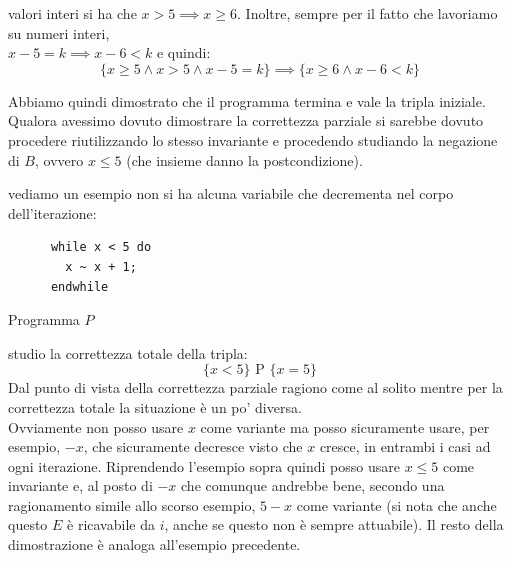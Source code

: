 \documentclass[a4paper,12pt, oneside]{book}
\begin{document}
\begin{esempio}
\begin{enumerate}
    valori interi si ha che $x>5\implies x\geq 6$. Inoltre, sempre per il fatto
    che lavoriamo su numeri interi, \\
    $x-5=k\implies x-6<k$ e quindi:
    \[\{x\geq 5\land x>5\land x-5=k\}\implies \{x\geq 6\land x-6 < k\}\]
  \end{enumerate}
  Abbiamo quindi dimostrato che il programma termina e vale la tripla
  iniziale.\\
  Qualora avessimo dovuto dimostrare la correttezza parziale si sarebbe dovuto
  procedere riutilizzando lo stesso invariante e procedendo studiando la
  negazione di $B$, ovvero $x\leq 5$ (che insieme danno la postcondizione).
\end{esempio}
\begin{esempio}
  vediamo un esempio non si ha alcuna variabile che decrementa nel corpo
  dell'iterazione:
  \begin{listing}[H]
    \begin{lstlisting}
      while x < 5 do
        x ~ x + 1;
      endwhile  
    \end{lstlisting}
    \caption{Programma $P$}
    \label{E:ti}
  \end{listing}
  studio la correttezza totale della tripla:
  \[\{x<5\}\mbox{ P }\{x=5\}\]
  Dal punto di vista della correttezza parziale ragiono come al solito mentre
  per la correttezza totale la situazione è un po' diversa.\\
  Ovviamente non posso usare $x$ come variante ma posso sicuramente usare, per
  esempio, $-x$, che sicuramente decresce visto che $x$ cresce, in entrambi i
  casi ad ogni iterazione. Riprendendo l'esempio sopra quindi posso usare $x\leq
  5$ come invariante e, al posto di $-x$ che comunque andrebbe bene, secondo una
  ragionamento simile allo scorso esempio, $5-x$ come variante (si nota che
  anche questo $E$ è ricavabile da $i$, anche se questo non è sempre attuabile).
  Il resto della dimostrazione è analoga all'esempio precedente.
\end{esempio}
\end{document}
